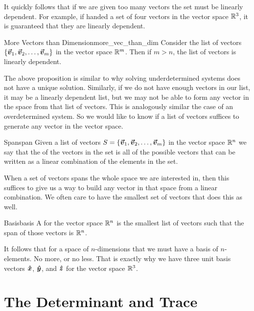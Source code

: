     It quickly follows that if we are given too many vectors the set must be linearly dependent.  For example, if handed a set of four vectors in the vector space $\mathbb{R}^3$, it is guaranteed that they are linearly dependent. 
    
    \begin{prop}{More Vectors than Dimension}{more_vec_than_dim}
        Consider the list of vectors $\{\boldsymbol{\boldsymbol{\vec{v}}}_1,\boldsymbol{\boldsymbol{\vec{v}}}_2,\dots,\boldsymbol{\boldsymbol{\vec{v}}}_m\}$ in the vector space $\mathbb{R}^m$.  Then if $m>n$, the list of vectors is linearly dependent.
    \end{prop}
    
    The above proposition is similar to why solving underdetermined systems does not have a unique solution. Similarly, if we do not have enough vectors in our list, it may be a linearly dependent list, but we may not be able to form any vector in the space from that list of vectors. This is analogously similar the case of an overdetermined system.  So we would like to know if a list of vectors suffices to generate any vector in the vector space.
    
    \begin{df}{Span}{span}
    Given a list of vectors $S=\{\boldsymbol{\boldsymbol{\vec{v}}}_1,\boldsymbol{\boldsymbol{\vec{v}}}_2,\dots,\boldsymbol{\boldsymbol{\vec{v}}}_m\}$ in the vector space $\mathbb{R}^n$ we say that the  of the vectors in the set is all of the possible vectors that can be written as a linear combination of the elements in the set. 
    \end{df}

    When a set of vectors spans the whole space we are interested in, then this suffices to give us a way to build any vector in that space from a linear combination.  We often care to have the smallest set of vectors that does this as well.
    
    \begin{df}{Basis}{basis}
    A  for the vector space $\mathbb{R}^n$ is the smallest list of vectors such that the span of those vectors is $\mathbb{R}^n$.
    \end{df}
    
    It follows that for a space of $n$-dimensions that we must have a basis of $n$-elements. No more, or no less.  That is exactly why we have three unit basis vectors $\boldsymbol{\hat{x}}$, $\boldsymbol{\hat{y}}$, and $\boldsymbol{\hat{z}}$ for the vector space $\mathbb{R}^3$.  
    
    \section{The Determinant and Trace}
    

